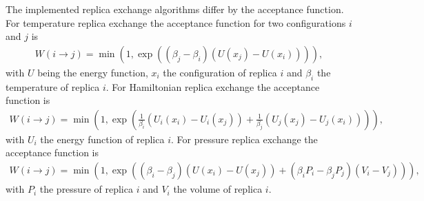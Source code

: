 \documentclass[12pt, twoside]{report}
\begin{document}
The implemented replica exchange algorithms differ by the acceptance function.
For temperature replica exchange the acceptance function for two configurations
\(i\) and \(j\) is \cite{Hansmann1997}
\begin{align}
  \label{eq:ch5:REMC} W(i\rightarrow j) = \min(1, \exp\left( (\beta_j - \beta_i)
(U(x_j) - U(x_i)) \right)),
\end{align} with $U$ being the energy function, \(x_i\) the configuration of
replica \(i\) and \(\beta_i\) the temperature of replica \(i\). For Hamiltonian
replica exchange the acceptance function is \cite{Bussi2014}
\begin{align}
  \label{eq:ch5:HREX} W(i\rightarrow j) = \min\left(1, \exp\left(
\frac{1}{\beta_i}(U_i(x_i) - U_i(x_j)) + \frac{1}{\beta_j}(U_j(x_j) - U_j(x_i))
\right)\right),
\end{align} with \(U_i\) the energy function of replica \(i\). For pressure
replica exchange the acceptance function is \cite{Okabe2001}
\begin{align}
  \label{eq:ch5:MPTMC} W(i\rightarrow j) = \min\left(1, \exp\left( (\beta_i -
\beta_j) (U(x_i) - U(x_j)) + (\beta_i P_i - \beta_j P_j) (V_i -
V_j)\right)\right),
\end{align} with \(P_i\) the pressure of replica \(i\) and \(V_i\) the volume of
replica \(i\).

\clearpage
{}

\clearpage
\printglossary[type=\acronymtype,title=List of Abbreviations]
\end{document}
